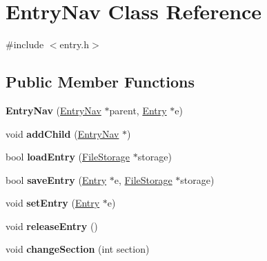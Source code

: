 \hypertarget{class_entry_nav}{}\section{Entry\+Nav Class Reference}
\label{class_entry_nav}


{\ttfamily \#include $<$entry.\+h$>$}

\subsection*{Public Member Functions}
\begin{DoxyCompactItemize}
\item 
\mbox{\label{class_entry_nav_a778223f04da2618c47b697d33d10559d}} 
{\bfseries Entry\+Nav} (\mbox{\hyperlink{class_entry_nav}{Entry\+Nav}} $\ast$parent, \mbox{\hyperlink{class_entry}{Entry}} $\ast$e)
\item 
\mbox{\label{class_entry_nav_af988d3085b14c1fa584d934a31a1e494}} 
void {\bfseries add\+Child} (\mbox{\hyperlink{class_entry_nav}{Entry\+Nav}} $\ast$)
\item 
\mbox{\label{class_entry_nav_ae8baa4eaf2eca2a813110c5272fba763}} 
bool {\bfseries load\+Entry} (\mbox{\hyperlink{class_file_storage}{File\+Storage}} $\ast$storage)
\item 
\mbox{\label{class_entry_nav_a51daafd4189df04bf0df6504b3c4b1f5}} 
bool {\bfseries save\+Entry} (\mbox{\hyperlink{class_entry}{Entry}} $\ast$e, \mbox{\hyperlink{class_file_storage}{File\+Storage}} $\ast$storage)
\item 
\mbox{\label{class_entry_nav_a935101b752fb22f735e62b83721f325c}} 
void {\bfseries set\+Entry} (\mbox{\hyperlink{class_entry}{Entry}} $\ast$e)
\item 
\mbox{\label{class_entry_nav_a1475c94b8cb03e8731d852190b8efc64}} 
void {\bfseries release\+Entry} ()
\item 
\mbox{\label{class_entry_nav_aa9d8db3a7fb50142d976111658e7c2f8}} 
void {\bfseries change\+Section} (int section)
\item 
\mbox{\label{class_entry_nav_a527cd33c59bd801382b73f26a42e2b64}} 

\end{DoxyCompactItemize}
